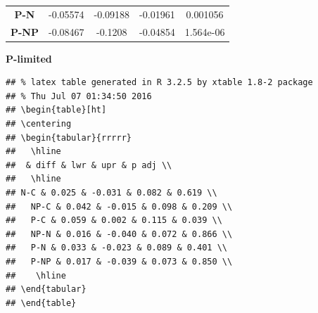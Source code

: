 \documentclass[]{article}
\begin{document}
\begin{longtable}[]{@{}ccccc@{}}
\begin{minipage}[t]{0.13\columnwidth}
\textbf{P-N}
\strut\end{minipage} &
\begin{minipage}[t]{0.11\columnwidth}\centering\strut
-0.05574
\strut\end{minipage} &
\begin{minipage}[t]{0.12\columnwidth}\centering\strut
-0.09188
\strut\end{minipage} &
\begin{minipage}[t]{0.11\columnwidth}\centering\strut
-0.01961
\strut\end{minipage} &
\begin{minipage}[t]{0.11\columnwidth}\centering\strut
0.001056
\strut\end{minipage}\tabularnewline
\begin{minipage}[t]{0.13\columnwidth}\centering\strut
\textbf{P-NP}
\strut\end{minipage} &
\begin{minipage}[t]{0.11\columnwidth}\centering\strut
-0.08467
\strut\end{minipage} &
\begin{minipage}[t]{0.12\columnwidth}\centering\strut
-0.1208
\strut\end{minipage} &
\begin{minipage}[t]{0.11\columnwidth}\centering\strut
-0.04854
\strut\end{minipage} &
\begin{minipage}[t]{0.11\columnwidth}\centering\strut
1.564e-06
\strut\end{minipage}\tabularnewline
\bottomrule
\end{longtable}

\textbf{P-limited}

\begin{verbatim}
## % latex table generated in R 3.2.5 by xtable 1.8-2 package
## % Thu Jul 07 01:34:50 2016
## \begin{table}[ht]
## \centering
## \begin{tabular}{rrrrr}
##   \hline
##  & diff & lwr & upr & p adj \\ 
##   \hline
## N-C & 0.025 & -0.031 & 0.082 & 0.619 \\ 
##   NP-C & 0.042 & -0.015 & 0.098 & 0.209 \\ 
##   P-C & 0.059 & 0.002 & 0.115 & 0.039 \\ 
##   NP-N & 0.016 & -0.040 & 0.072 & 0.866 \\ 
##   P-N & 0.033 & -0.023 & 0.089 & 0.401 \\ 
##   P-NP & 0.017 & -0.039 & 0.073 & 0.850 \\ 
##    \hline
## \end{tabular}
## \end{table}
\end{verbatim}
\end{document}
